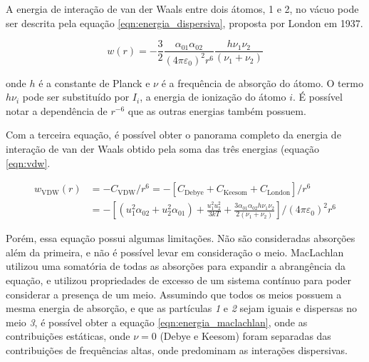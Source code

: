 	A energia de interação de van der Waals entre dois átomos, 1 e 2,  no vácuo pode ser descrita pela equação \ref{eqn:energia_dispersiva}, proposta por London em 1937.
	
	\begin{equation}
		w(r) = - \frac { 3 } { 2 } \frac { \alpha _ { 01 } \alpha _ { 02 } } { \left( 4 \pi \varepsilon _ { 0 } \right) ^ { 2 } r ^ { 6 } } \frac { h \nu _ { 1 } \nu _ { 2 } } { \left( \nu _ { 1 } + \nu _ { 2 } \right) }
		\label{eqn:energia_dispersiva}
	\end{equation}
	
	\noindent onde \(h\) é a constante de Planck e \(\nu\) é a frequência de absorção do átomo. O termo \(h\nu_i\) pode ser substituído por \(I_i\), a energia de ionização do átomo \(i\). É possível notar a dependência de \(r^{-6}\) que as outras energias também possuem.
	
	
	Com a terceira equação, é possível obter o panorama completo da energia de interação de van der Waals obtido pela soma das três energias (equação \ref{eqn:vdw}.
	
	\begin{subequations}
	\begin{align}
		w_{\mathrm{VDW}}(r) &= -C_{\mathrm{VDW}}/r^{6} = -\left[C_{\mathrm{Debye}}+C_{\mathrm{Keesom}}+C_{\mathrm{London}}\right]/r^{6} \label{eqn:vdw_geral} \\
							&= - \left[ \left( u_{1}^{2}\alpha_{02} + u_{2}^{2}\alpha_{01} \right)   + \frac{u_{1}^{2}u_{2}^{2}}{3kT} + \frac{3\alpha_{01}\alpha_{02}h\nu_{1}\nu_{2}}{2\left(\nu_{1} + \nu_{2}\right)}\right]/\left(4\pi\varepsilon_{0}\right)^{2}r^{6} \label{eqn:vdw_completa}
	\end{align}
	\label{eqn:vdw}
	\end{subequations}
	
	Porém, essa equação possui algumas limitações. Não são consideradas absorções além da primeira, e não é possível levar em consideração o meio. MacLachlan utilizou uma somatória de todas as absorções para expandir a abrangência da equação, e utilizou propriedades de excesso de um sistema contínuo para poder considerar a presença de um meio. Assumindo que todos os meios possuem a mesma energia de absorção, e que as partículas \emph{1} e \emph{2} sejam iguais e dispersas no meio \emph{3}, é possível obter a equação \ref{eqn:energia_maclachlan}, onde as contribuições estáticas, onde \(\nu = 0\) (Debye e Keesom) foram separadas das contribuições de frequências altas, onde predominam as interações dispersivas.
	
